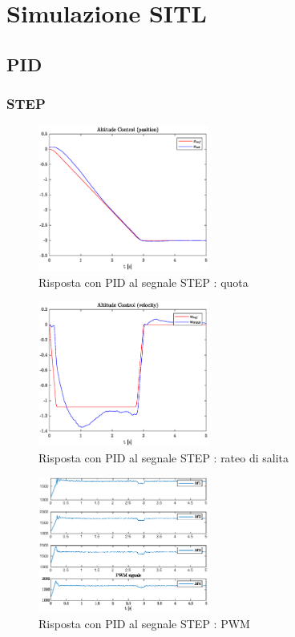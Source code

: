 \section{Simulazione SITL}
\subsection{PID}
\subsubsection{STEP}
\begin{figure}
	\centering
	\includegraphics[width=0.5\textwidth]{Simulazioni/Figure/STEPaltitudecontrolposPID}
	\caption{Risposta con PID al segnale STEP : quota}
\end{figure}

\begin{figure}
	\centering
	\includegraphics[width=0.5\textwidth]{Simulazioni/Figure/STEPaltitudecontrolvelPID}
	\caption{Risposta con PID al segnale STEP : rateo di salita}
\end{figure}

\begin{figure}
	\centering
	\includegraphics[width=0.5\textwidth]{Simulazioni/Figure/STEPpwmPID}
	\caption{Risposta con PID al segnale STEP : PWM}
\end{figure}

